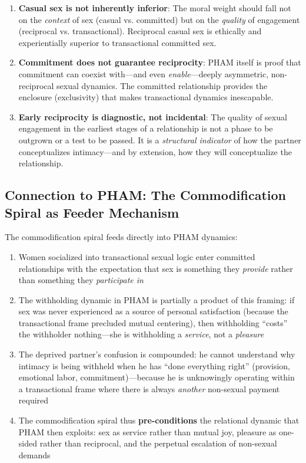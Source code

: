 \documentclass[12pt,openany]{book}
\numberwithin{equation}{chapter}
\begin{document}
\begin{enumerate}
    \item \textbf{Casual sex is not inherently inferior}: The moral weight should fall not on the \textit{context} of sex (casual vs. committed) but on the \textit{quality} of engagement (reciprocal vs. transactional). Reciprocal casual sex is ethically and experientially superior to transactional committed sex.
    
    \item \textbf{Commitment does not guarantee reciprocity}: PHAM itself is proof that commitment can coexist with---and even \textit{enable}---deeply asymmetric, non-reciprocal sexual dynamics. The committed relationship provides the enclosure (exclusivity) that makes transactional dynamics inescapable.
    
    \item \textbf{Early reciprocity is diagnostic, not incidental}: The quality of sexual engagement in the earliest stages of a relationship is not a phase to be outgrown or a test to be passed. It is a \textit{structural indicator} of how the partner conceptualizes intimacy---and by extension, how they will conceptualize the relationship.
\end{enumerate}

\subsection{Connection to PHAM: The Commodification Spiral as Feeder Mechanism}

The commodification spiral feeds directly into PHAM dynamics:

\begin{enumerate}
    \item Women socialized into transactional sexual logic enter committed relationships with the expectation that sex is something they \textit{provide} rather than something they \textit{participate in}
    \item The withholding dynamic in PHAM is partially a product of this framing: if sex was never experienced as a source of personal satisfaction (because the transactional frame precluded mutual centering), then withholding ``costs'' the withholder nothing---she is withholding a \textit{service}, not a \textit{pleasure}
    \item The deprived partner's confusion is compounded: he cannot understand why intimacy is being withheld when he has ``done everything right'' (provision, emotional labor, commitment)---because he is unknowingly operating within a transactional frame where there is always \textit{another} non-sexual payment required
    \item The commodification spiral thus \textbf{pre-conditions} the relational dynamic that PHAM then exploits: sex as service rather than mutual joy, pleasure as one-sided rather than reciprocal, and the perpetual escalation of non-sexual demands
\end{enumerate}
\end{document}
